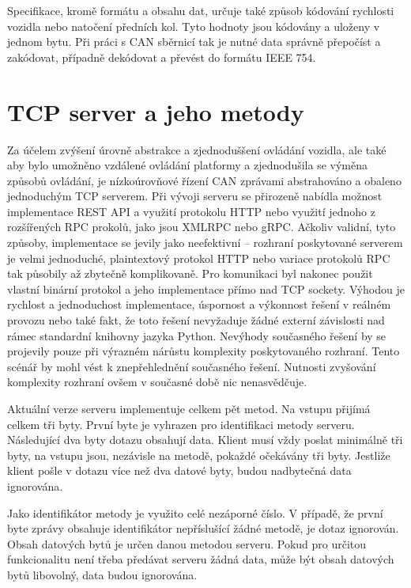 \documentclass[czech, bachelor]{diploma}
\begin{document}
Specifikace, kromě formátu a obsahu dat, určuje také způsob kódování rychlosti vozidla nebo natočení předních kol. Tyto hodnoty
jsou kódovány a uloženy v jednom bytu. Při práci s CAN sběrnicí tak je nutné data správně přepočíst a zakódovat, případně
dekódovat a převést do formátu IEEE 754.

\section{TCP server a jeho metody} \label{server-methods}

Za účelem zvýšení úrovně abstrakce a zjednoduššení ovládání vozidla, ale také aby bylo umožněno vzdálené ovládání platformy
a zjednodušila se výměna způsobů ovládání, je nízkoúrovňové řízení CAN zprávami abstrahováno a obaleno jednoduchým TCP serverem.
Při vývoji serveru se přirozeně nabídla možnost implementace REST API a využití protokolu HTTP nebo využití jednoho z rozšířených
RPC prokolů, jako jsou XMLRPC nebo gRPC. Ačkoliv validní, tyto způsoby, implementace se jevily jako neefektivní -- rozhraní
poskytované serverem je velmi jednoduché, plaintextový protokol HTTP nebo variace protokolů RPC tak působily až zbytečně
komplikovaně. Pro komunikaci byl nakonec použit vlastní binární protokol a jeho implementace přímo nad TCP sockety.
Výhodou je rychlost a jednoduchost implementace, úspornost a výkonnost řešení v reálném provozu nebo také fakt, že toto řešení
nevyžaduje žádné externí závislosti nad rámec standardní knihovny jazyka Python. Nevýhody současného řešení by se projevily
pouze při výrazném nárůstu komplexity poskytovaného rozhraní. Tento scénář by mohl vést k znepřehlednění současného řešení.
Nutnosti zvyšování komplexity rozhraní ovšem v současné době nic nenasvědčuje.

Aktuální verze serveru implementuje celkem pět metod. Na vstupu přijímá celkem tři byty. První byte je vyhrazen pro identifikaci
metody serveru. Následující dva byty dotazu obsahují data. Klient musí vždy poslat minimálně tři byty, na vstupu jsou, nezávisle
na metodě, pokaždé očekávány tři byty. Jestliže klient pošle v dotazu více než dva datové byty, budou nadbytečná data ignorována.

Jako identifikátor metody je využito celé nezáporné číslo. V případě, že první byte zprávy obsahuje identifikátor nepříslušící
žádné metodě, je dotaz ignorován. Obsah datových bytů je určen danou metodou serveru. Pokud pro určitou funkcionalitu není třeba
předávat serveru žádná data, může být obsah datových bytů libovolný, data budou ignorována.
\end{document}
